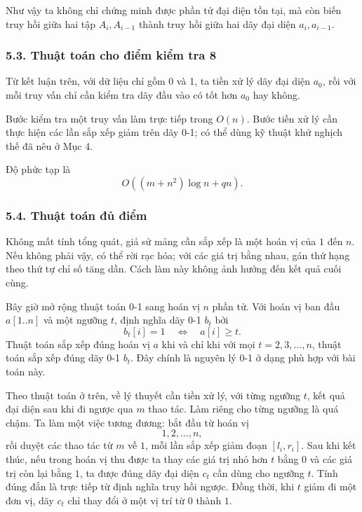 \documentclass[11pt]{article}
\begin{document}
Như vậy ta không chỉ chứng minh được phần tử đại diện tồn tại, mà còn biến
truy hồi giữa hai tập \(A_i,A_{i-1}\) thành truy hồi giữa hai dãy đại diện
\(a_i,a_{i-1}\).

\subsubsection*{5.3. Thuật toán cho điểm kiểm tra 8}

Từ kết luận trên, với dữ liệu chỉ gồm 0 và 1, ta tiền xử lý dãy đại diện
\(a_0\), rồi với mỗi truy vấn chỉ cần kiểm tra dãy đầu vào có tốt hơn
\(a_0\) hay không.

Bước kiểm tra một truy vấn làm trực tiếp trong \(O(n)\). Bước tiền xử lý cần
thực hiện các lần sắp xếp giảm trên dãy 0-1; có thể dùng kỹ thuật khử nghịch
thế đã nêu ở Mục 4.

Độ phức tạp là
\[
  O((m+n^2)\log n+qn).
\]

\subsubsection*{5.4. Thuật toán đủ điểm}

Không mất tính tổng quát, giả sử mảng cần sắp xếp là một hoán vị của \(1\)
đến \(n\). Nếu không phải vậy, có thể rời rạc hóa; với các giá trị bằng nhau,
gán thứ hạng theo thứ tự chỉ số tăng dần. Cách làm này không ảnh hưởng đến
kết quả cuối cùng.

Bây giờ mở rộng thuật toán 0-1 sang hoán vị \(n\) phần tử. Với hoán vị ban đầu
\(a[1..n]\) và một ngưỡng \(t\), định nghĩa dãy 0-1 \(b_t\) bởi
\[
  b_t[i]=1 \quad\Longleftrightarrow\quad a[i]\ge t.
\]
Thuật toán sắp xếp đúng hoán vị \(a\) khi và chỉ khi với mọi
\(t=2,3,\ldots,n\), thuật toán sắp xếp đúng dãy 0-1 \(b_t\). Đây chính là
nguyên lý 0-1 ở dạng phù hợp với bài toán này.

Theo thuật toán ở trên, về lý thuyết cần tiền xử lý, với từng ngưỡng \(t\),
kết quả đại diện sau khi đi ngược qua \(m\) thao tác. Làm riêng cho từng
ngưỡng là quá chậm. Ta làm một việc tương đương: bắt đầu từ hoán vị
\[
  1,2,\ldots,n,
\]
rồi duyệt các thao tác từ \(m\) về \(1\), mỗi lần sắp xếp giảm đoạn
\([l_i,r_i]\). Sau khi kết thúc, nếu trong hoán vị thu được ta thay các giá
trị nhỏ hơn \(t\) bằng \(0\) và các giá trị còn lại bằng \(1\), ta được đúng
dãy đại diện \(c_t\) cần dùng cho ngưỡng \(t\). Tính đúng đắn là trực tiếp từ
định nghĩa truy hồi ngược. Đồng thời, khi \(t\) giảm đi một đơn vị, dãy
\(c_t\) chỉ thay đổi ở một vị trí từ \(0\) thành \(1\).
\end{document}
